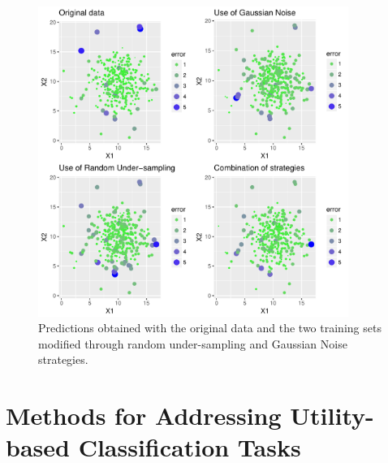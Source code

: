 \documentclass[10pt,a4paper]{article}\usepackage[]{graphicx}\usepackage[]{color}
\newenvironment{knitrout}{}{} %
\begin{document}
\begin{knitrout}\footnotesize
{}\color{fgcolor}\begin{figure}

{\centering \includegraphics[width=0.9\textwidth]{figures/UBL-ImbR_difs-1} 

}

\caption[Predictions obtained with the original data and the two training sets modified through random under-sampling and Gaussian Noise strategies]{Predictions obtained with the original data and the two training sets modified through random under-sampling and Gaussian Noise strategies.}\label{fig:ImbR_difs}
\end{figure}


\end{knitrout}

\section{Methods for Addressing Utility-based Classification Tasks }\label{sec:methClass}
\end{document}
